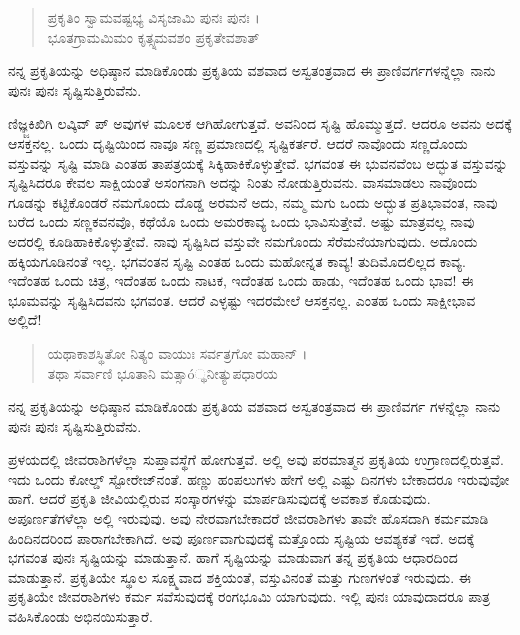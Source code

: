 \begin{verse}
ಪ್ರಕೃತಿಂ ಸ್ವಾಮವಷ್ಟಭ್ಯ ವಿಸೃಜಾಮಿ ಪುನಃ ಪುನಃ ।\\ಭೂತಗ್ರಾಮಮಿಮಂ ಕೃತ್ಸ್ನಮವಶಂ ಪ್ರಕೃತೇವಶಾತ್ 
\end{verse}

ನನ್ನ ಪ್ರಕೃತಿಯನ್ನು ಅಧಿಷ್ಠಾನ ಮಾಡಿಕೊಂಡು ಪ್ರಕೃತಿಯ ವಶವಾದ ಅಸ್ವತಂತ್ರವಾದ ಈ ಪ್ರಾಣಿವರ್ಗಗಳನ್ನೆಲ್ಲಾ ನಾನು ಪುನಃ ಪುನಃ ಸೃಷ್ಟಿಸುತ್ತಿರುವೆನು.

ಣಿಜ್ಞ್ಜಕಿಖಿಗಿ ಲವ್ಕಿವ್ ಪ್ ಅವುಗಳ ಮೂಲಕ ಆಗಿಹೋಗುತ್ತವೆ. ಅವನಿಂದ ಸೃಷ್ಟಿ ಹೊಮ್ಮುತ್ತದೆ. ಆದರೂ ಅವನು ಅದಕ್ಕೆ ಆಸಕ್ತನಲ್ಲ. ಒಂದು ದೃಷ್ಟಿಯಿಂದ ನಾವೂ ಸಣ್ಣ ಪ್ರಮಾಣದಲ್ಲಿ ಸೃಷ್ಟಿಕರ್ತರೆ. ಆದರೆ ನಾವೊಂದು ಸಣ್ಣದೊಂದು ವಸ್ತುವನ್ನು ಸೃಷ್ಟಿ ಮಾಡಿ ಎಂತಹ ತಾಪತ್ರಯಕ್ಕೆ ಸಿಕ್ಕಿಹಾಕಿಕೊಳ್ಳುತ್ತೇವೆ. ಭಗವಂತ ಈ ಭುವನವೆಂಬ ಅದ್ಭುತ ವಸ್ತುವನ್ನು ಸೃಷ್ಟಿಸಿದರೂ ಕೇವಲ ಸಾಕ್ಷಿಯಂತೆ ಅಸಂಗನಾಗಿ ಅದನ್ನು ನಿಂತು ನೋಡುತ್ತಿರುವನು. ವಾಸಮಾಡಲು ನಾವೊಂದು ಗೂಡನ್ನು ಕಟ್ಟಿಕೊಂಡರೆ ನಮಗೊಂದು ದೊಡ್ಡ ಅರಮನೆ ಅದು, ನಮ್ಮ ಮಗು ಒಂದು ಅದ್ಭುತ ಪ್ರತಿಭಾವಂತ, ನಾವು ಬರೆದ ಒಂದು ಸಣ್ಣಕವನವೊ, ಕಥೆಯೊ ಒಂದು ಅಮರಕಾವ್ಯ ಒಂದು ಭಾವಿಸುತ್ತೇವೆ. ಅಷ್ಟು ಮಾತ್ರವಲ್ಲ ನಾವು ಅದರಲ್ಲಿ ಕೂಡಿಹಾಕಿಕೊಳ್ಳುತ್ತೇವೆ. ನಾವು ಸೃಷ್ಟಿಸಿದ ವಸ್ತುವೇ ನಮಗೊಂದು ಸೆರೆಮನೆಯಾಗುವುದು. ಅದೊಂದು ಹಕ್ಕಿಯಗೂಡಿನಂತೆ ಇಲ್ಲ. ಭಗವಂತನ ಸೃಷ್ಟಿ ಎಂತಹ ಒಂದು ಮಹೋನ್ನತ ಕಾವ್ಯ! ತುದಿಮೊದಲಿಲ್ಲದ ಕಾವ್ಯ. ಇದೆಂತಹ ಒಂದು ಚಿತ್ರ, ಇದೆಂತಹ ಒಂದು ನಾಟಕ, ಇದೆಂತಹ ಒಂದು ಹಾಡು, ಇದೆಂತಹ ಒಂದು ಭಾವ! ಈ ಭೂಮವನ್ನು ಸೃಷ್ಟಿಸಿದವನು ಭಗವಂತ. ಆದರೆ ಎಳ್ಳಷ್ಟು ಇದರಮೇಲೆ ಆಸಕ್ತನಲ್ಲ. ಎಂತಹ ಒಂದು ಸಾಕ್ಷೀಭಾವ ಅಲ್ಲಿದೆ!

\begin{verse}
ಯಥಾಕಾಶಸ್ಥಿತೋ ನಿತ್ಯಂ ವಾಯುಃ ಸರ್ವತ್ರಗೋ ಮಹಾನ್ ।\\ತಥಾ ಸರ್ವಾಣಿ ಭೂತಾನಿ ಮತ್ಸಾó್ಥನೀತ್ಯುಪಧಾರಯ 
\end{verse}

{\small ನನ್ನ ಪ್ರಕೃತಿಯನ್ನು ಅಧಿಷ್ಠಾನ ಮಾಡಿಕೊಂಡು ಪ್ರಕೃತಿಯ ವಶವಾದ ಅಸ್ವತಂತ್ರವಾದ ಈ ಪ್ರಾಣಿವರ್ಗ ಗಳನ್ನೆಲ್ಲಾ ನಾನು ಪುನಃ ಪುನಃ ಸೃಷ್ಟಿಸುತ್ತಿರುವೆನು.}

ಪ್ರಳಯದಲ್ಲಿ ಜೀವರಾಶಿಗಳೆಲ್ಲಾ ಸುಪ್ತಾವಸ್ಥೆಗೆ ಹೋಗುತ್ತವೆ. ಅಲ್ಲಿ ಅವು ಪರಮಾತ್ಮನ ಪ್ರಕೃತಿಯ ಉಗ್ರಾಣದಲ್ಲಿರುತ್ತವೆ. ಇದು ಒಂದು ಕೋಲ್ಡ್ ಸ್ಟೋರೇಜ್​ನಂತೆ. ಹಣ್ಣು ಹಂಪಲುಗಳು ಹೇಗೆ ಅಲ್ಲಿ ಎಷ್ಟು ದಿನಗಳು ಬೇಕಾದರೂ ಇರುವುವೋ ಹಾಗೆ. ಆದರೆ ಪ್ರಕೃತಿ ಜೀವಿಯಲ್ಲಿರುವ ಸಂಸ್ಕಾರಗಳನ್ನು ಮಾರ್ಪಡಿಸುವುದಕ್ಕೆ ಅವಕಾಶ ಕೊಡುವುದು. ಅಪೂರ್ಣತೆಗಳೆಲ್ಲಾ ಅಲ್ಲಿ ಇರುವುವು. ಅವು ನೇರವಾಗಬೇಕಾದರೆ ಜೀವರಾಶಿಗಳು ತಾವೇ ಹೊಸದಾಗಿ ಕರ್ಮಮಾಡಿ ಹಿಂದಿನದರಿಂದ ಪಾರಾಗಬೇಕಾಗಿದೆ. ಅವು ಪೂರ್ಣವಾಗುವುದಕ್ಕೆ ಮತ್ತೊಂದು ಸೃಷ್ಟಿಯ ಆವಶ್ಯಕತೆ ಇದೆ. ಅದಕ್ಕೆ ಭಗವಂತ ಪುನಃ ಸೃಷ್ಟಿಯನ್ನು ಮಾಡುತ್ತಾನೆ. ಹಾಗೆ ಸೃಷ್ಟಿಯನ್ನು ಮಾಡುವಾಗ ತನ್ನ ಪ್ರಕೃತಿಯ ಆಧಾರದಿಂದ ಮಾಡುತ್ತಾನೆ. ಪ್ರಕೃತಿಯೇ ಸ್ಥೂಲ ಸೂಕ್ಷ್ಮವಾದ ಶಕ್ತಿಯಂತೆ, ವಸ್ತುವಿನಂತೆ ಮತ್ತು ಗುಣಗಳಂತೆ ಇರುವುದು. ಈ ಪ್ರಕೃತಿಯೇ ಜೀವರಾಶಿಗಳು ಕರ್ಮ ಸವೆಸುವುದಕ್ಕೆ ರಂಗಭೂಮಿ ಯಾಗುವುದು. ಇಲ್ಲಿ ಪುನಃ ಯಾವುದಾದರೂ ಪಾತ್ರ ವಹಿಸಿಕೊಂಡು ಅಭಿನಯಿಸುತ್ತಾರೆ.

